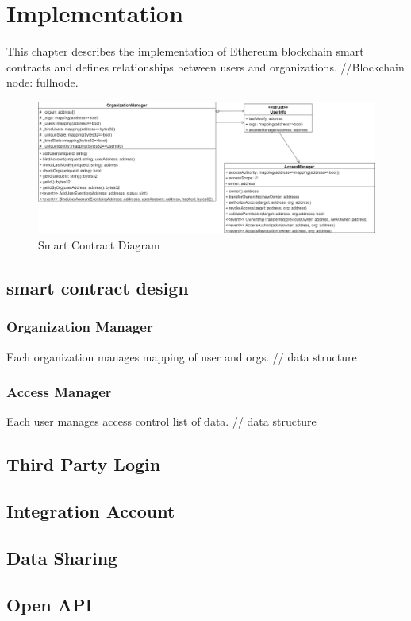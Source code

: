 \chapter{Implementation} 
\label{chapter:implementation}
This chapter describes the implementation of Ethereum blockchain smart contracts and defines relationships between users and organizations.
//Blockchain node: fullnode.

\begin{figure}[hb]
    \centering
    \includegraphics[height=!,width=1\linewidth,keepaspectratio=true]{figures/smart_contract_diagram.png}
    \caption{{\footnotesize Smart Contract Diagram}}
    \label{fig:smart_contract_diagram}
\end{figure}
\section{smart contract design}
\subsection*{Organization Manager}
Each organization manages mapping of user and orgs.
// data structure
\subsection*{Access Manager}
Each user manages access control list of data.
// data structure

\section{Third Party Login}
\section{Integration Account}
\section{Data Sharing}
\section{Open API}